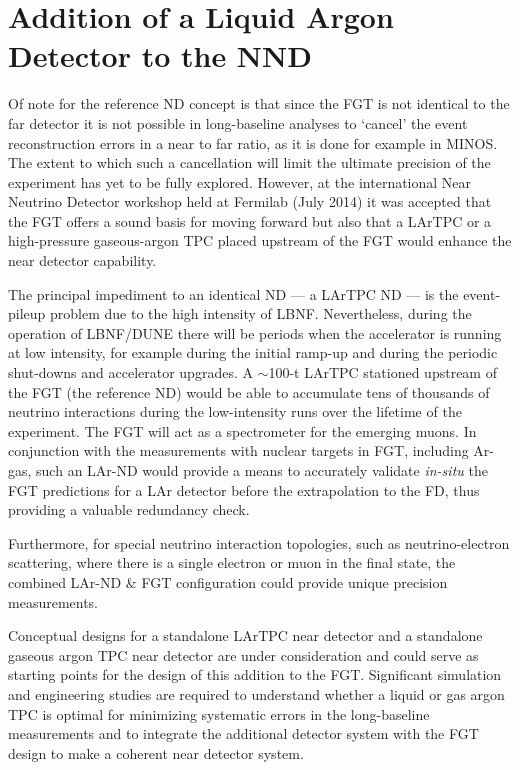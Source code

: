 \section{Addition of a Liquid Argon Detector to the NND}
\label{sec:detectors-nd-alt}

Of note for the reference ND concept is that since the FGT is not
identical to the far detector it is not possible in long-baseline
analyses to `cancel' the event reconstruction errors in a near to far
ratio, as it is done for example in MINOS.  The extent to which such a
cancellation will limit the ultimate precision of the experiment has
yet to be fully explored.  However, at the international Near Neutrino
Detector workshop held at Fermilab (July 2014) it was accepted that
the FGT offers a sound basis for moving forward but also that a LArTPC
or a high-pressure gaseous-argon TPC placed upstream of the FGT would
enhance the near detector capability.


The principal impediment to an
identical ND --- a LArTPC ND --- is the event-pileup problem
due to the high intensity of LBNF. Nevertheless, during the operation
of LBNF/DUNE there will be periods when the accelerator is running at
low intensity, for example during the initial ramp-up and during the
periodic shut-downs and accelerator upgrades. A $\sim$100-t LArTPC
stationed upstream of the FGT (the reference ND) would be able to
accumulate tens of thousands of neutrino interactions during the
low-intensity runs over the lifetime of the experiment.  The FGT will
act as a spectrometer for the emerging muons. In conjunction with the
measurements with nuclear targets in FGT, including Ar-gas, such an
LAr-ND would provide a means to accurately validate {\em in-situ} the
FGT predictions for a LAr detector before the extrapolation to the FD,
thus providing a valuable redundancy check.

Furthermore, for special neutrino interaction topologies, such as
neutrino-electron scattering, where there is a single electron or muon
in the final state, the combined LAr-ND \& FGT configuration could
provide unique precision measurements.

Conceptual designs for a standalone LArTPC near detector and a
standalone gaseous argon TPC near detector are under consideration and
could serve as starting points for the design of this addition to the
FGT.  Significant simulation and engineering studies are required to
understand whether a liquid or gas argon TPC is optimal for minimizing
systematic errors in the long-baseline measurements and to integrate
the additional detector system with the FGT design to make a coherent
near detector system.

